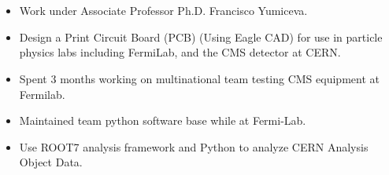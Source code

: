 \documentclass[10pt,a4paper,ragged2e,withhyper]{altacv}
\begin{document}
\begin{paracol}{2}
 \\



 \\



\begin{itemize}
\item Work under Associate Professor Ph.D. Francisco Yumiceva.
\item Design a Print Circuit Board (PCB) (Using Eagle CAD) for use in particle physics labs including FermiLab, and the CMS detector at CERN.
\item Spent 3 months working on multinational team testing CMS equipment at Fermilab.
\item Maintained team python software base while at Fermi-Lab.
\item Use ROOT7 analysis framework and Python to analyze CERN Analysis Object Data.
\end{itemize}

\end{paracol}
\end{document}
